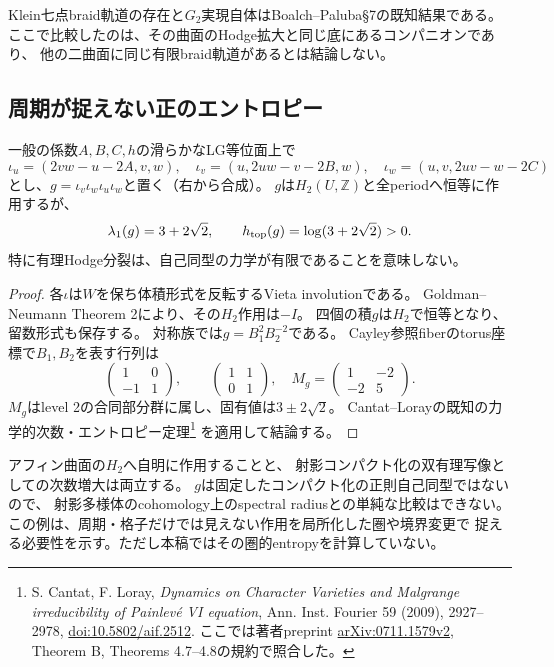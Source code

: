 Klein七点braid軌道の存在と$G_2$実現自体はBoalch--Paluba\S7の既知結果である。
ここで比較したのは、その曲面のHodge拡大と同じ底にあるコンパニオンであり、
他の二曲面に同じ有限braid軌道があるとは結論しない。

\subsection{周期が捉えない正のエントロピー}
\begin{proposition}[ホモロジー恒等だが次数が指数増大する自己同型]
\label{prop:period-invisible-entropy}
一般の係数$A,B,C,h$の滑らかなLG等位面上で
\[
 \iota_u=(2vw-u-2A,v,w),\quad
 \iota_v=(u,2uw-v-2B,w),\quad
 \iota_w=(u,v,2uv-w-2C)
\]
とし、$g=\iota_v\iota_w\iota_u\iota_w$と置く（右から合成）。
$g$は$H_2(U,\mathbb Z)$と全periodへ恒等に作用するが、
\[
 \lambda_1(g)=3+2\sqrt2,
 \qquad h_{\rm top}(g)=\log(3+2\sqrt2)>0.
\]
特に有理Hodge分裂は、自己同型の力学が有限であることを意味しない。
\end{proposition}
\begin{proof}
各$\iota$は$W$を保ち体積形式を反転するVieta involutionである。
Goldman--Neumann Theorem 2により、その$H_2$作用は$-I$。
四個の積$g$は$H_2$で恒等となり、留数形式も保存する。
対称族では$g=B_1^2B_2^{-2}$である。
Cayley参照fiberのtorus座標で$B_1,B_2$を表す行列は
\[
 \begin{pmatrix}1&0\\-1&1\end{pmatrix},\qquad
 \begin{pmatrix}1&1\\0&1\end{pmatrix},
 \quad M_g=\begin{pmatrix}1&-2\\-2&5\end{pmatrix}.
\]
$M_g$はlevel 2の合同部分群に属し、固有値は$3\pm2\sqrt2$。
Cantat--Lorayの既知の力学的次数・エントロピー定理\footnote{
S. Cantat, F. Loray, \emph{Dynamics on Character Varieties and Malgrange irreducibility of Painlev\'e VI equation},
Ann. Inst. Fourier 59 (2009), 2927--2978,
\href{https://doi.org/10.5802/aif.2512}{doi:10.5802/aif.2512}.
ここでは著者preprint \href{https://arxiv.org/abs/0711.1579}{arXiv:0711.1579v2},
Theorem B, Theorems 4.7--4.8の規約で照合した。}
を適用して結論する。
\end{proof}

アフィン曲面の$H_2$へ自明に作用することと、
射影コンパクト化の双有理写像としての次数増大は両立する。
$g$は固定したコンパクト化の正則自己同型ではないので、
射影多様体のcohomology上のspectral radiusとの単純な比較はできない。
この例は、周期・格子だけでは見えない作用を局所化した圏や境界変更で
捉える必要性を示す。ただし本稿ではその圏的entropyを計算していない。

